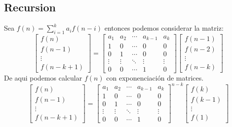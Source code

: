 	\subsection{Recursion}
		\begin{flushleft}
			Sea $f(n) = \sum_{i=1}^{k} a_i f(n-i)$ entonces
			podemos considerar la matriz:
			\[
			\begin{bmatrix}
				f(n) \\
				f(n-1) \\
				\vdots \\
				f(n-k+1)
			\end{bmatrix}
			=
			\begin{bmatrix}
				a_1 & a_2 & \cdots & a_{k-1} & a_{k}\\
				1 & 0 & \cdots & 0 & 0\\
				0 & 1 & \cdots & 0 & 0\\
				\vdots & \vdots & \ddots & \vdots & \vdots\\
				0 & 0 & \cdots & 1 & 0
			\end{bmatrix}
			\begin{bmatrix}
				f(n-1) \\
				f(n-2) \\
				\vdots \\
				f(n-k)
			\end{bmatrix}
			\]
			De aqui podemos calcular $f(n)$ con exponenciación de matrices.
			\[
			\begin{bmatrix}
				f(n) \\
				f(n-1) \\
				\vdots \\
				f(n-k+1)
			\end{bmatrix}
			=
			\begin{bmatrix}
				a_1 & a_2 & \cdots & a_{k-1} & a_{k}\\
				1 & 0 & \cdots & 0 & 0\\
				0 & 1 & \cdots & 0 & 0\\
				\vdots & \vdots & \ddots & \vdots & \vdots\\
				0 & 0 & \cdots & 1 & 0
			\end{bmatrix}
			^{n-k}
			\begin{bmatrix}
				f(k) \\
				f(k-1) \\
				\vdots \\
				f(1)
			\end{bmatrix}
			\]
		\end{flushleft}

